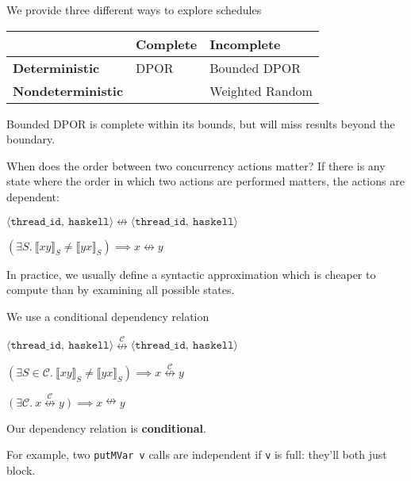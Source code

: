 \documentclass{beamer}
\newcommand{\xnleftrightarrow}[1]{\stackrel{#1}{\nleftrightarrow}}
\begin{document}
\begin{frame}{We provide three different ways to explore schedules}
\begin{center}
\begin{tabular}{l|ll}
                          & \textbf{Complete} & \textbf{Incomplete} \\ \hline
\textbf{Deterministic}    & DPOR              & Bounded DPOR        \\
\textbf{Nondeterministic} &                   & Weighted Random     \\
\end{tabular}
\end{center}

Bounded DPOR is complete within its bounds, but will miss results
beyond the boundary.
\end{frame}

\begin{frame}{When does the order between two concurrency actions matter?}
  If there is any state where the order in which two actions are
  performed matters, the actions are dependent:

  \begin{center}
    $\langle\texttt{thread\_id},~\texttt{haskell}\rangle
    \nleftrightarrow
    \langle\texttt{thread\_id},~\texttt{haskell}\rangle$

    $\left(\exists S.\ \llbracket xy \rrbracket_{S} \neq \llbracket yx \rrbracket_{S}\right)
    \implies x \nleftrightarrow y$
  \end{center}

  In practice, we usually define a syntactic approximation which is
  cheaper to compute than by examining all possible states.
\end{frame}

\begin{frame}{We use a conditional dependency relation}
  \begin{center}
    $\langle\texttt{thread\_id},~\texttt{haskell}\rangle
    \xnleftrightarrow{\mathcal C}
    \langle\texttt{thread\_id},~\texttt{haskell}\rangle$

    $\left(\exists S \in \mathcal C.\ \llbracket xy \rrbracket_{S} \neq \llbracket yx \rrbracket_{S}\right)
    \implies x \xnleftrightarrow{\mathcal C} y$

    $\left(\exists \mathcal C.\ x \xnleftrightarrow{\mathcal C} y \right)
    \implies x \nleftrightarrow y$
  \end{center}

  Our dependency relation is \textbf{conditional}.

  For example, two \texttt{putMVar v} calls are independent if
  \texttt{v} is full: they'll both just block.
\end{frame}
\end{document}
